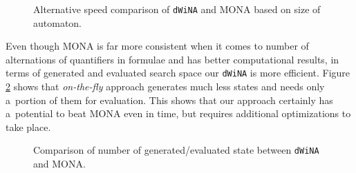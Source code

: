 \begin{figure}[h!]
 \begin{center}
 \end{center}
 \caption{Alternative speed comparison of \texttt{dWiNA} and \textsc{MONA}
 based on size of automaton.}\label{size-n}
\end{figure}

Even though \textsc{MONA} is far more consistent when it comes to number of
alternations of quantifiers in formulae and has better computational results, in
terms of generated and evaluated search space our \texttt{dWiNA} is more
efficient. Figure \ref{state-graph} shows that \emph{on-the-fly} approach
generates much less states and needs only a~portion of them for evaluation. This
shows that our approach certainly has a~potential to beat \textsc{MONA} even in
time, but requires additional optimizations to take place.

\begin{figure}[h!]
 \begin{center}
 \end{center}
 \caption{Comparison of number of generated/evaluated state between
 \texttt{dWiNA} and \textsc{MONA}.}\label{state-graph}
\end{figure}

